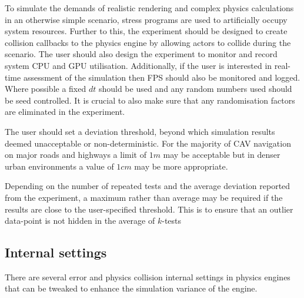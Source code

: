  
To simulate the demands of realistic rendering and complex physics calculations in an otherwise simple scenario, stress programs are used to artificially occupy system resources. 
Further to this, the experiment should be designed to create collision callbacks to the physics engine by allowing actors to collide during the scenario. 
%
The user should also design the experiment to monitor and record system CPU and GPU utilisation. Additionally, if the user is interested in real-time assessment of the simulation then FPS should also be monitored and logged.
%
Where possible a fixed $dt$ should be used and any random numbers used should be seed controlled.
It is crucial to also make sure that any randomisation factors are eliminated in the experiment.

The user should set a deviation threshold, beyond which simulation results deemed unacceptable or non-deterministic. For the majority of CAV navigation on major roads and highways a limit of $1m$ may be acceptable but in denser urban environments a value of $1cm$ may be more appropriate. 

Depending on the number of repeated tests and the average deviation reported from the experiment, a maximum rather than average may be required if the results are close to the user-specified threshold. This is to ensure that an outlier data-point is not hidden in the average of $k$-tests


\subsection{Internal settings}
There are several error and physics collision internal settings in physics engines that can be tweaked to enhance the simulation variance of the engine.

